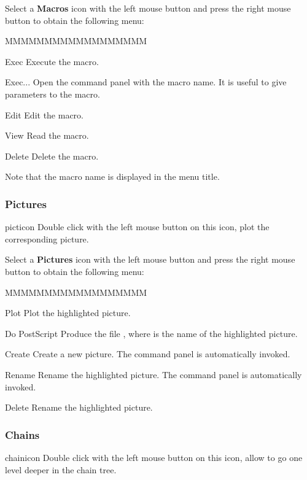 Select a {\bf \XPAW{} Macros} icon with the left mouse button and press
the right mouse button to obtain the following menu:


\begin{DLsf}{MMMMMMMMMMMMMMMMMM}
\item[Exec]            Execute the macro.
\item[Exec...]         Open the command panel  with the macro name.
                       It is useful to give parameters to the macro.
\item[Edit]            Edit the macro.
\item[View]            Read the macro.
\item[Delete]          Delete the macro.
\end{DLsf}

Note that the macro name is displayed in the menu title.


\subsubsection{Pictures}
\begin{ICON}{picticon}
Double click with the left mouse button on this icon, plot the corresponding
picture.
\end{ICON}

Select a {\bf Pictures} icon with the left mouse button and press
the right mouse button to obtain the following menu:


\begin{DLsf}{MMMMMMMMMMMMMMMMMM}
\item[Plot]             Plot the highlighted picture.
\item[Do PostScript]    Produce the \PS{} file , where
                         is the name of the highlighted picture.
\item[Create]           Create a new picture. The command panel
                         is automatically invoked.
\item[Rename]           Rename the highlighted picture. The command panel
                         is automatically invoked.
\item[Delete]           Rename the highlighted picture.
\end{DLsf}


\subsubsection{Chains}
\begin{ICON}{chainicon}
Double click with the left mouse button on this icon, allow to go one level
deeper in the chain tree.
\end{ICON}

